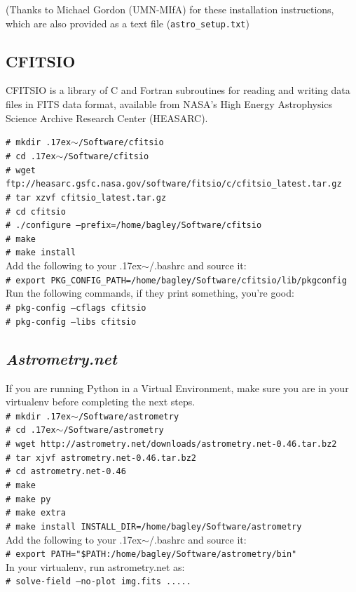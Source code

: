 \documentclass{article}
\newcommand{\ttsim}{\raise.17ex\hbox{$\scriptstyle\mathtt{\sim}$}}
\newcommand{\shellcmd}[1]{\indent\indent\texttt{\small\# #1}\\}
\newcommand{\An}{\textit{Astrometry.net}}
\begin{document}
\noindent (Thanks to Michael Gordon (UMN-MIfA) for these installation 
instructions, which are also provided as a text file (\texttt{astro\_setup.txt})

\subsection{CFITSIO}
CFITSIO is a library of C and Fortran subroutines for reading and writing
data files in FITS data format, available from NASA's High Energy
Astrophysics Science Archive Research Center (HEASARC). 

\shellcmd{mkdir \ttsim/Software/cfitsio}
\shellcmd{cd \ttsim/Software/cfitsio}
\shellcmd{wget ftp://heasarc.gsfc.nasa.gov/software/fitsio/c/cfitsio\_latest.tar.gz}
\shellcmd{tar xzvf cfitsio\_latest.tar.gz}
\shellcmd{cd cfitsio}
\shellcmd{./configure --prefix=/home/bagley/Software/cfitsio}
\shellcmd{make}
\shellcmd{make install}

\noindent Add the following to your \ttsim/.bashrc and source it: \\
\shellcmd{export PKG\_CONFIG\_PATH=/home/bagley/Software/cfitsio/lib/pkgconfig}

\noindent Run the following commands, if they print something, you're good: \\
\shellcmd{pkg-config --cflags cfitsio}
\shellcmd{pkg-config --libs cfitsio}

\subsection{\An}
If you are running Python in a Virtual Environment, make sure you are 
in your virtualenv before completing the next steps. \\
\shellcmd{mkdir \ttsim/Software/astrometry}
\shellcmd{cd \ttsim/Software/astrometry}
\shellcmd{wget http://astrometry.net/downloads/astrometry.net-0.46.tar.bz2}
\shellcmd{tar xjvf astrometry.net-0.46.tar.bz2}
\shellcmd{cd astrometry.net-0.46}
\shellcmd{make}
\shellcmd{make py}
\shellcmd{make extra}
\shellcmd{make install INSTALL\_DIR=/home/bagley/Software/astrometry}

\noindent Add the following to your \ttsim/.bashrc and source it: \\
\shellcmd{export PATH="\$PATH:/home/bagley/Software/astrometry/bin"} 

\noindent In your virtualenv, run astrometry.net as: \\
\shellcmd{solve-field --no-plot img.fits .....}
\end{document}
